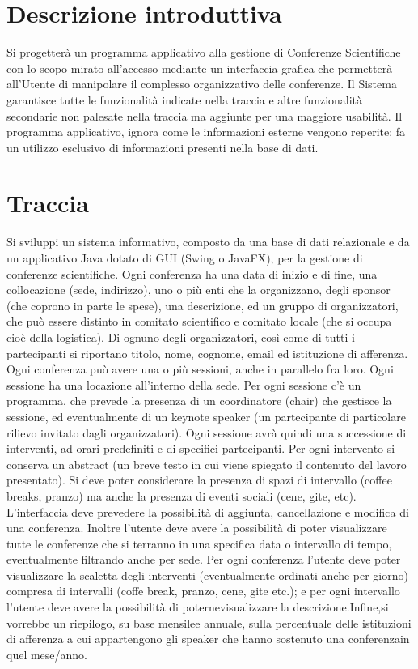 \documentclass[a4paper,italian,10pt,openany]{book}
\begin{document}
    \section{Descrizione introduttiva}
	Si progetterà un programma applicativo alla gestione di Conferenze Scientifiche con lo scopo mirato all'accesso mediante un interfaccia grafica che permetterà all'Utente di manipolare il complesso organizzativo delle conferenze. Il Sistema garantisce tutte le funzionalità indicate nella traccia e altre funzionalità secondarie non palesate nella traccia ma aggiunte per una maggiore usabilità. Il programma applicativo, ignora come le informazioni esterne vengono reperite: fa un utilizzo esclusivo di informazioni presenti nella base di dati.
	\section{Traccia}
	Si sviluppi un sistema informativo, composto da una base di dati relazionale e da un applicativo Java dotato di GUI (Swing o JavaFX), per la gestione di conferenze scientifiche. Ogni conferenza ha una data di inizio e di fine, una collocazione (sede, indirizzo), uno o più enti che la organizzano, degli sponsor (che coprono in parte le spese), una descrizione, ed un gruppo di organizzatori, che può essere distinto in comitato scientifico e comitato  locale  (che  si  occupa  cioè  della  logistica).  Di  ognuno  degli  organizzatori,  così  come  di  tutti  i partecipanti si riportano titolo, nome, cognome, email ed istituzione di afferenza. Ogni conferenza può avere una o più sessioni, anche in parallelo fra loro. Ogni sessione ha una locazione all'interno della sede. Per ogni sessione c'è un programma, che prevede la presenza di un coordinatore (chair) che gestisce la sessione, ed eventualmente di un keynote speaker (un partecipante di particolare rilievo invitato dagli organizzatori). Ogni sessione  avrà  quindi  una  successione  di  interventi,  ad  orari  predefiniti  e  di  specifici  partecipanti.  Per  ogni intervento si conserva un abstract (un breve testo in cui viene spiegato il contenuto del lavoro presentato). Si deve poter considerare la presenza di spazi di intervallo (coffee breaks, pranzo) ma anche la presenza di eventi sociali (cene, gite, etc). L’interfaccia deve prevedere la possibilità di aggiunta, cancellazione e modifica di una conferenza. Inoltre l’utente deve avere la possibilità di poter visualizzare tutte le conferenze che si terranno  in  una  specifica  data  o  intervallo  di  tempo,  eventualmente  filtrando  anche  per  sede.  Per  ogni conferenza l’utente deve poter visualizzare la scaletta degli interventi (eventualmente ordinati anche  per giorno) compresa di intervalli (coffe break, pranzo, cene, gite etc.); e per ogni intervallo l’utente deve avere la possibilità di poternevisualizzare la descrizione.Infine,si vorrebbe un riepilogo, su base mensilee annuale, sulla percentuale delle istituzioni  di  afferenza a  cui  appartengono  gli  speaker che  hanno  sostenuto una conferenzain quel mese/anno.
\end{document}
